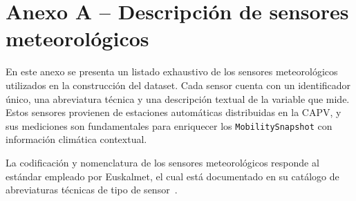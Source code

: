 \section*{Anexo A – Descripción de sensores meteorológicos}
\label{anexo:sensores}

En este anexo se presenta un listado exhaustivo de los sensores meteorológicos utilizados en la construcción del dataset. Cada sensor cuenta con un identificador único, una abreviatura técnica y una descripción textual de la variable que mide. Estos sensores provienen de estaciones automáticas distribuidas en la CAPV, y sus mediciones son fundamentales para enriquecer los \texttt{MobilitySnapshot} con información climática contextual.

La codificación y nomenclatura de los sensores meteorológicos responde al estándar empleado por Euskalmet, el cual está documentado en su catálogo de abreviaturas técnicas de tipo de sensor~\cite{sensorTypeAbbrv}.

\vspace{1em}

